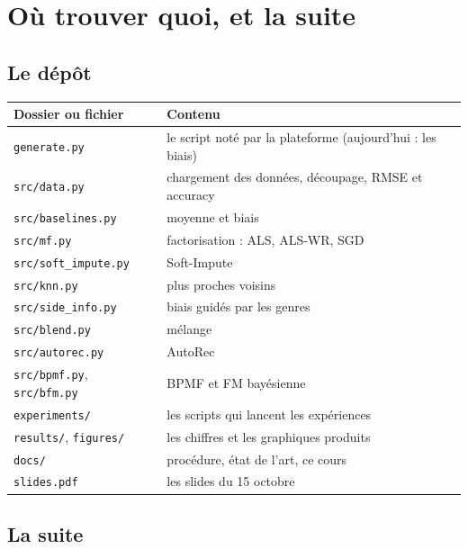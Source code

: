 \documentclass[11pt,a4paper]{article}
\begin{document}
\section{Où trouver quoi, et la suite}

\subsection{Le dépôt}

\begin{center}
\small
\begin{tabularx}{\linewidth}{@{}lX@{}}
\toprule
\textbf{Dossier ou fichier} & \textbf{Contenu} \\
\midrule
\texttt{generate.py} & le script noté par la plateforme (aujourd'hui : les biais) \\
\texttt{src/data.py} & chargement des données, découpage, RMSE et accuracy \\
\texttt{src/baselines.py} & moyenne et biais \\
\texttt{src/mf.py} & factorisation : ALS, ALS-WR, SGD \\
\texttt{src/soft\_impute.py} & Soft-Impute \\
\texttt{src/knn.py} & plus proches voisins \\
\texttt{src/side\_info.py} & biais guidés par les genres \\
\texttt{src/blend.py} & mélange \\
\texttt{src/autorec.py} & AutoRec \\
\texttt{src/bpmf.py}, \texttt{src/bfm.py} & BPMF et FM bayésienne \\
\texttt{experiments/} & les scripts qui lancent les expériences \\
\texttt{results/}, \texttt{figures/} & les chiffres et les graphiques produits \\
\texttt{docs/} & procédure, état de l'art, ce cours \\
\texttt{slides.pdf} & les slides du 15 octobre \\
\bottomrule
\end{tabularx}
\end{center}

\subsection{La suite}
\end{document}
